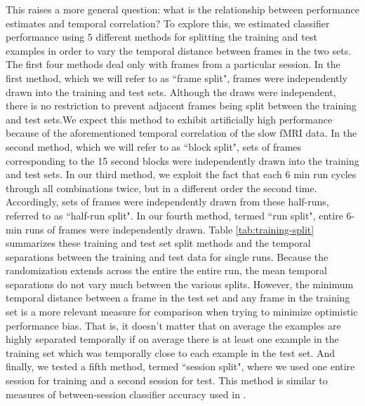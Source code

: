 \documentclass[preprint,5p,authoryear]{elsarticle}
\begin{document}
This raises a more general question: what is the relationship between performance estimates and temporal correlation?
To explore this, we estimated classifier performance using 5 different methods for splitting the training and test examples in order to vary the temporal distance between frames in the two sets. 
The first four methods deal only with frames from a particular session.
In the first method, which we will refer to as  ``frame split", frames were independently drawn into the training and test sets. 
Although the draws were independent, there is no restriction to prevent adjacent frames being split between the training and test sets.We expect this method to exhibit artificially high performance because of the aforementioned temporal correlation of the slow fMRI data.
In the second method, which we will refer to as ``block split", sets of frames corresponding to the 15 second blocks were independently drawn into the training and test sets.
In our third method, we exploit the fact that each 6 min run cycles through all combinations twice, but in a different order the second time.
Accordingly, sets of frames were independently drawn from these half-runs, referred to as ``half-run split". 
In our fourth method, termed ``run split", entire 6-min runs of frames were independently drawn. 
Table \ref{tab:training-split} summarizes these training and test set split methods and the temporal separations between the training and test data for single runs. 
Because the randomization extends across the entire the entire run, the mean temporal separations do not vary much between the various splits. 
However, the minimum temporal distance between a frame in the test set and any frame in the training set is a more relevant measure for comparison when trying to minimize optimistic performance bias.
That is, it doesn't matter that on average the examples are highly separated temporally if on average there is at least one example in the training set which was temporally close to each example in the test set.
And finally, we tested a fifth method, termed ``session split", where we used one entire session for training and a second session for test.
This method is similar to measures of between-session classifier accuracy used in \citep{Haynes2005}.

\end{document}
